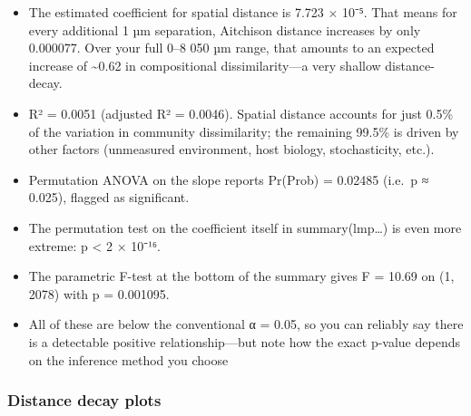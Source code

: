 \documentclass[
]{article}
\begin{document}
\begin{itemize}
\item
  The estimated coefficient for spatial distance is 7.723 × 10⁻⁵. That
  means for every additional 1 µm separation, Aitchison distance
  increases by only 0.000077. Over your full 0--8 050 µm range, that
  amounts to an expected increase of \textasciitilde0.62 in
  compositional dissimilarity---a very shallow distance-decay.
\item
  R² = 0.0051 (adjusted R² = 0.0046). Spatial distance accounts for just
  0.5\% of the variation in community dissimilarity; the remaining
  99.5\% is driven by other factors (unmeasured environment, host
  biology, stochasticity, etc.).
\item
  Permutation ANOVA on the slope reports Pr(Prob) = 0.02485 (i.e.~p ≈
  0.025), flagged as significant.
\item
  The permutation test on the coefficient itself in summary(lmp\ldots)
  is even more extreme: p \textless{} 2 × 10⁻¹⁶.
\item
  The parametric F-test at the bottom of the summary gives F = 10.69 on
  (1, 2078) with p = 0.001095.
\item
  All of these are below the conventional α = 0.05, so you can reliably
  say there is a detectable positive relationship---but note how the
  exact p-value depends on the inference method you choose
\end{itemize}

\subsubsection{Distance decay plots}\label{distance-decay-plots}
\end{document}
